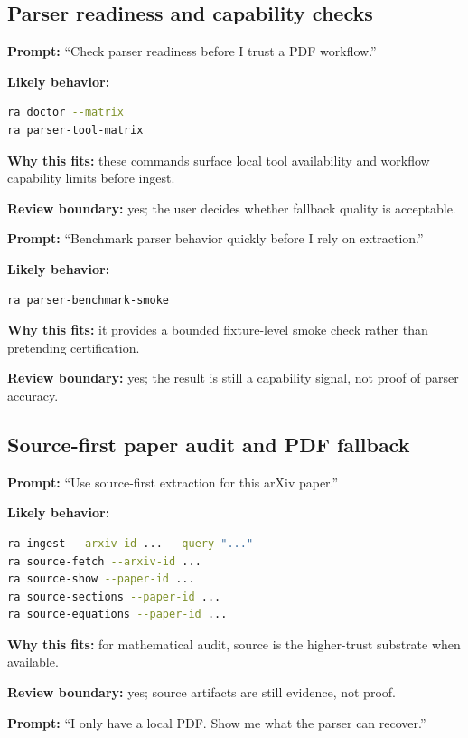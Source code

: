 \documentclass[11pt,a4paper,openany]{book}
\begin{document}
\subsection{Parser readiness and capability checks}

\textbf{Prompt:} ``Check parser readiness before I trust a PDF workflow.''

\textbf{Likely behavior:}
\begin{lstlisting}[language=bash]
ra doctor --matrix
ra parser-tool-matrix
\end{lstlisting}

\textbf{Why this fits:} these commands surface local tool availability and
workflow capability limits before ingest.

\textbf{Review boundary:} yes; the user decides whether fallback quality is
acceptable.

\textbf{Prompt:} ``Benchmark parser behavior quickly before I rely on
extraction.''

\textbf{Likely behavior:}
\begin{lstlisting}[language=bash]
ra parser-benchmark-smoke
\end{lstlisting}

\textbf{Why this fits:} it provides a bounded fixture-level smoke check rather
than pretending certification.

\textbf{Review boundary:} yes; the result is still a capability signal, not
proof of parser accuracy.

\subsection{Source-first paper audit and PDF fallback}

\textbf{Prompt:} ``Use source-first extraction for this arXiv paper.''

\textbf{Likely behavior:}
\begin{lstlisting}[language=bash]
ra ingest --arxiv-id ... --query "..."
ra source-fetch --arxiv-id ...
ra source-show --paper-id ...
ra source-sections --paper-id ...
ra source-equations --paper-id ...
\end{lstlisting}

\textbf{Why this fits:} for mathematical audit, source is the higher-trust
substrate when available.

\textbf{Review boundary:} yes; source artifacts are still evidence, not proof.

\textbf{Prompt:} ``I only have a local PDF. Show me what the parser can
recover.''
\end{document}
